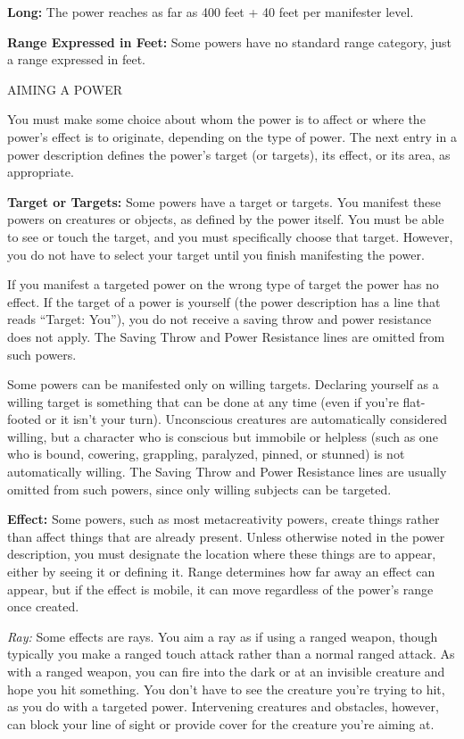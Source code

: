 \documentclass{article}
\begin{document}
\textbf{Long: }The power reaches as far as 400 feet + 40 feet per manifester level.

\textbf{Range Expressed in Feet:} Some powers have no standard range category, 
just a range expressed in feet.

\vspace{12pt}
AIMING A POWER

You must make some choice about whom the power is to affect or where the power's 
effect is to originate, depending on the type of power. The next entry in a power 
description defines the power's target (or targets), its effect, or its area, as 
appropriate.

\textbf{Target or Targets: }Some powers\textit{ }have a target or targets. You 
manifest these powers on creatures or objects, as defined by the power itself. 
You must be able to see or touch the target, and you must specifically choose that 
target. However, you do not have to select your target until you finish manifesting 
the power.

If you manifest a targeted power on the wrong type of target the power has no effect. 
If the target of a power is yourself (the power description has a line that reads 
``Target: You''), you do not receive a saving throw and power resistance does not 
apply. The Saving Throw and Power Resistance lines are omitted from such powers.

Some powers can be manifested only on willing targets. Declaring yourself as a 
willing target is something that can be done at any time (even if you're flat-footed 
or it isn't your turn). Unconscious creatures are automatically considered willing, 
but a character who is conscious but immobile or helpless (such as one who is bound, 
cowering, grappling, paralyzed, pinned, or stunned) is not automatically willing. 
The Saving Throw and Power Resistance lines are usually omitted from such powers, 
since only willing subjects can be targeted.

\textbf{Effect:} Some powers, such as most metacreativity powers, create things 
rather than affect things that are already present. Unless otherwise noted in the 
power description, you must designate the location where these things are to appear, 
either by seeing it or defining it. Range determines how far away an effect can 
appear, but if the effect is mobile, it can move regardless of the power's range 
once created.

\textit{Ray: }Some effects are rays. You aim a ray as if using a ranged weapon, 
though typically you make a ranged touch attack rather than a normal ranged attack. 
As with a ranged weapon, you can fire into the dark or at an invisible creature 
and hope you hit something. You don't have to see the creature you're trying to 
hit, as you do with a targeted power. Intervening creatures and obstacles, however, 
can block your line of sight or provide cover for the creature you're aiming at.
\end{document}
